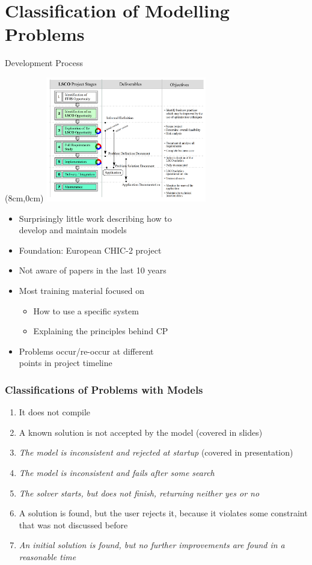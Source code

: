 \section{Classification of Modelling Problems}
\begin{frame}{Development Process}
\begin{textblock*}{7cm}(8cm,0cm)
\includegraphics[width=7cm]{images/chic2lifecycle.PNG}
\end{textblock*}
\begin{itemize}
    \item Surprisingly little work describing how to \\develop and maintain models
    \item Foundation: European CHIC-2 project \\\cite{DBLP:conf/dimacs/Gervet98}
    \item Not aware of papers in the last 10 years
    \item Most training material focused on 
    \begin{itemize}
        \item How to use a specific system
        \item Explaining the principles behind CP
    \end{itemize}
    \item Problems occur/re-occur at different\\ points in project timeline
\end{itemize}
\end{frame}

\begin{frame}
\frametitle{Classifications of Problems with Models}
\begin{enumerate}
\item \textcolor{black!50}{It does not compile}
\item A known solution is not accepted by the model (covered in slides)
\item \emph{The model is inconsistent and rejected at startup} (covered in presentation)
\item \emph{The model is inconsistent and fails after some search}
\item \emph{The solver starts, but does not finish, returning neither yes or no}
\item \textcolor{black!50}{A solution is found, but the user rejects it, because it violates some constraint that was not discussed before}
\item \emph{An initial solution is found, but no further improvements are found in a reasonable time}
\end{enumerate}
\end{frame}

